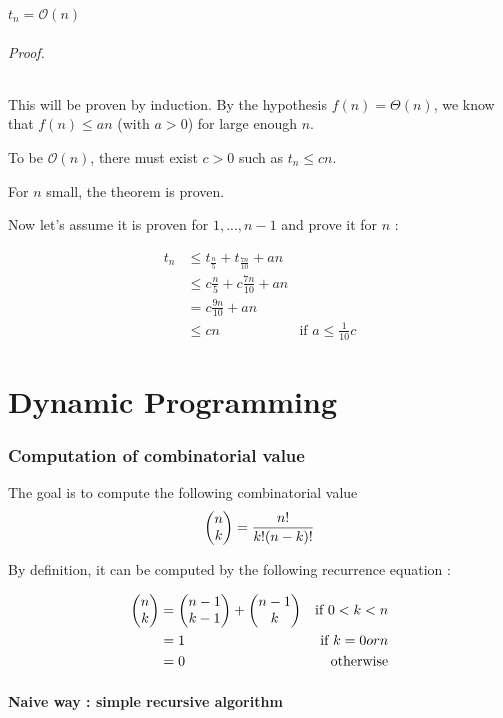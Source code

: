 \begin{theorem}
$t_n = \mathcal{O} (n)$
\end{theorem}

\paragraph*{Proof.}This will be proven by induction. By the hypothesis $f(n) = \Theta (n)$, we know that $f(n) \leq an$ (with $a>0$) for large enough $n$.

To be $\mathcal{O}(n)$, there must exist $c>0$ such as $t_n \leq cn$.

For $n$ small, the theorem is proven.

Now let's assume it is proven for $1,...,n-1$ and prove it for $n$ :

\begin{align*}
t_n &\leq t_{\frac{n}{5}} + t_{\frac{7n}{10}} + an\\
&\leq c \frac{n}{5} + c \frac{7n}{10} + an \\
&= c \frac{9n}{10} + an\\
&\leq cn &\text{if } a\leq \frac{1}{10}c
\end{align*}
\QED


\part{Dynamic Programming}

    \section{Computation of combinatorial value}



The goal is to compute the following combinatorial value  $$\left( \begin{matrix} n\\ k\end{matrix} \right) = \frac{n!}{k!(n-k)!}$$

By definition, it can be computed by the following recurrence equation :

\begin{align*}
\left( \begin{matrix} n\\ k\end{matrix} \right) &= \left( \begin{matrix} n-1\\ k-1\end{matrix} \right) + \left( \begin{matrix} n-1\\ k\end{matrix} \right) & \text{if } 0 < k<n\\
&=1 & \text{if } k=0 or n\\
&=0 & \text{otherwise}
\end{align*}

        
        
        \subsection{Naive way : simple recursive algorithm}



